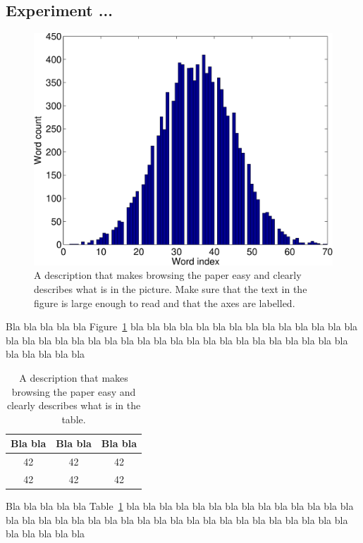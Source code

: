 \documentclass[a4paper,12pt]{article}
\begin{document}
\subsection{Experiment ...}

\begin{figure}
\centering
\includegraphics[width=0.8\linewidth]{histogram}
\caption{A description that makes browsing the paper easy and clearly 
describes what is in the picture. Make sure that the text in the figure 
is large enough to read and that the axes are labelled.}
\label{fig:histogram}
\end{figure}

Bla bla bla bla bla Figure~\ref{fig:histogram} bla bla bla bla bla bla 
bla bla bla bla bla bla bla bla bla bla bla bla bla bla bla bla bla 
bla bla bla bla bla bla bla bla bla bla bla bla bla bla bla bla bla 

\begin{table}
\begin{center}
\begin{tabular}{|c|c|c|}
\hline
Bla bla & Bla bla & Bla bla \\ \hline
42 & 42 & 42 \\ \hline
42 & 42 & 42 \\ \hline
\end{tabular}
\caption{A description that makes browsing the paper easy and clearly 
describes what is in the table.}
\label{tab:results}
\end{center}
\end{table}

Bla bla bla bla bla Table~\ref{tab:results} bla bla bla bla bla bla 
bla bla bla bla bla bla bla bla bla bla bla bla bla bla bla bla bla 
bla bla bla bla bla bla bla bla bla bla bla bla bla bla bla bla bla 
\end{document}
